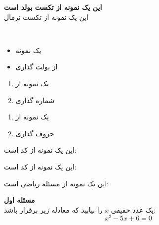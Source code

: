 \textbf{این یک نمونه از تکست بولد است}\\
این یک نمونه از تکست نرمال


\textbf{}\\


\begin{itemize}

    \item یک نمونه

    \item از بولت گذاری

\end{itemize}

\begin{enumerate}

    \item یک نمونه از

    \item شماره گذاری

\end{enumerate}

{
\renewcommand{\labelenumi}{\alph{enumi}.}
\begin{enumerate}

    \item یک نمونه از

    \item حروف گذاری

\end{enumerate}
}

این یک نمونه از کد  است:
\lr{}

این یک نمونه از کد  است:
\lr{}

این یک نمونه از مسئله ریاضی است:
\begin{mathbox}

\textbf{مسئله اول}\\
یک عدد حقیقی $x$ را بیابید که معادله زیر برقرار باشد:
$$x^2 - 5x + 6 = 0$$

\end{mathbox}